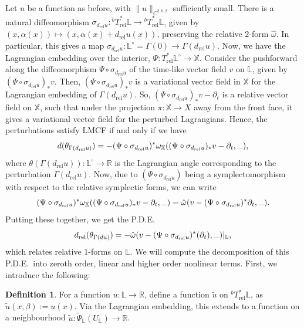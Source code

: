 \documentclass[10pt, a4paper]{article}
\theoremstyle{plain}%
\theoremstyle{definition}
\newtheorem{defn}[theorem]{Definition}
\numberwithin{figure}{section}
\numberwithin{equation}{section}
\newcommand{\bL}{\mathbb{L}}
\newcommand{\bX}{\mathbb{X}}
\newcommand{\bR}{\mathbb{R}}
\newcommand{\pa}{\partial}
\newcommand{\rt}{\rightarrow}
\newcommand{\dr}{d_\mathrm{rel}}
\newcommand{\tu}{\tilde{u}}
\newcommand{\tpsil}{\tilde{\Psi}_\bL}
\newcommand{\rel}{\mathrm{rel}}
\begin{document}
 Let $u$ be a function as before, with $\|u\|_{C^{2,0,2}}$ sufficiently small. There is a natural diffeomorphism $\sigma_{d_\mathrm{rel}u}: {^bT}^*_\mathrm{rel}\mathbb{L} \rightarrow {^bT}^*_\mathrm{rel}\mathbb{L}$, given by $(x,\alpha(x)) \mapsto (x,\alpha(x) +d_{\mathrm{rel}}u(x))$, preserving the relative $2$-form $\hat{\omega}$. In particular, this gives a map $\sigma_{\dr u} : \bL^\circ = \Gamma(0)\rt\Gamma(\dr u)$. Now, we have the Lagrangian embedding over the interior, $\Psi : T^*_{\mathrm{rel}}\bL^\circ \rt \bX$. Consider the pushforward along the diffeomorphism $\Psi\circ \sigma_{\dr u}$ of the time-like vector field $v$ on $\mathbb{L}$, given by $(\Psi\circ \sigma_{\dr u})_*v$. Then, $(\Psi\circ \sigma_{\dr u})_*v$ is a variational vector field in $\bX$ for the Lagrangian embedding of $\Gamma(\dr u)$. So, $(\Psi\circ \sigma_{\dr u})_*v - \pa_t $ is a relative vector field on $\bX$, such that under the projection $\pi : \bX\rt X$ away from the front face, it gives a variational vector field for the perturbed Lagrangians. Hence, the perturbations satisfy LMCF if and only if we have\[
d(\theta_{\Gamma(\dr u)}) = -(\Psi\circ \sigma_{\dr u})^*\omega_\bX((\Psi\circ \sigma_{\dr u})_*v - \partial_t, \rule{0.25cm}{0.05mm}),
\] 
where $\theta(\Gamma(\dr u)) : \bL^\circ \rt \bR$ is the Lagrangian angle corresponding to the perturbation $\Gamma(\dr u)$. Now, due to $(\Psi\circ \sigma_{\dr u})$ being a symplectomorphism with respect to the relative symplectic forms, we can write \[
(\Psi\circ \sigma_{\dr u})^*\omega_\bX((\Psi\circ \sigma_{\dr u})_*v - \partial_t, \rule{0.25cm}{0.05mm})= \hat{\omega}(v - (\Psi\circ \sigma_{\dr u})^*\partial_t, \rule{0.25cm}{0.05mm}).
\] 
Putting these together, we get the P.D.E.
\begin{equation}\label{1}
	d_\mathrm{rel}(\theta_{\Gamma(du)}) = -\hat{\omega}(v- {(\Psi\circ \sigma_{\dr u})^*(\partial_t)}, \rule{0.25cm}{0.05mm} )|_{\bL},
\end{equation}
which relates relative $1$-forms on $\mathbb{L}$. We will compute the decomposition of this P.D.E.\ into zeroth order, linear and higher order nonlinear terms. First, we introduce the following:
\begin{defn}
	For a function $u:\bL\rt\bR$, define a function $\tu$ on $^bT^*_\rel\bL$, as $\tu(x,\beta):=u(x)$. Via the Lagrangian embedding, this extends to a function on a neighbourhood $\tu:\tpsil(U_{\bL})\rt \bR$.
\end{defn}
\end{document}
